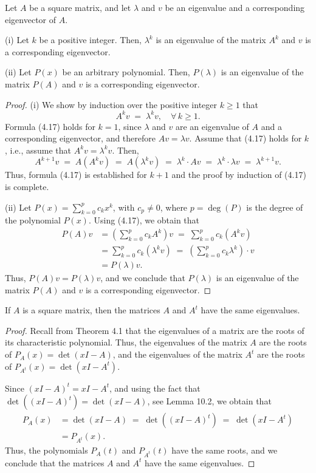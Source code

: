 \begin{lemma}
Let $A$ be a square matrix, and let $\lambda$ and $v$ be an eigenvalue and a
corresponding eigenvector of $A$.

(i) Let $k$ be a positive integer. Then, $\lambda^k$ is an eigenvalue of the matrix
$A^k$ and $v$ is a corresponding eigenvector.

(ii) Let $P(x)$ be an arbitrary polynomial. Then, $P(\lambda)$ is an eigenvalue of the
matrix $P(A)$ and $v$ is a corresponding eigenvector.
\end{lemma}

\begin{proof}
(i) We show by induction over the positive integer $k \geq 1$ that
\begin{equation}
A^k v \;=\; \lambda^k v, \quad \forall\, k \geq 1.
\end{equation}
Formula (4.17) holds for $k=1$, since $\lambda$ and $v$ are an eigenvalue of $A$ and a
corresponding eigenvector, and therefore $Av = \lambda v$. Assume that (4.17) holds
for $k$, i.e., assume that $A^k v = \lambda^k v$. Then,
\[
A^{k+1}v \;=\; A(A^k v) \;=\; A(\lambda^k v) \;=\; \lambda^k \cdot Av \;=\;
\lambda^k \cdot \lambda v \;=\; \lambda^{k+1}v.
\]
Thus, formula (4.17) is established for $k+1$ and the proof by induction of (4.17) is
complete.

(ii) Let $P(x) = \sum_{k=0}^p c_k x^k$, with $c_p \neq 0$, where $p = \deg(P)$ is the
degree of the polynomial $P(x)$. Using (4.17), we obtain that
\begin{align*}
P(A)v &= \left( \sum_{k=0}^p c_k A^k \right) v \;=\; \sum_{k=0}^p c_k \left( A^k v
\right)\\
&= \sum_{k=0}^p c_k \left( \lambda^k v \right) \;=\; \left( \sum_{k=0}^p c_k
\lambda^k \right) \cdot v\\
&= P(\lambda) v.
\end{align*}
Thus, $P(A)v = P(\lambda)v$, and we conclude that $P(\lambda)$ is an eigenvalue of the
matrix $P(A)$ and $v$ is a corresponding eigenvector.
\end{proof}

\begin{lemma}
If $A$ is a square matrix, then the matrices $A$ and $A^t$ have the same eigenvalues.
\end{lemma}

\begin{proof}
Recall from Theorem 4.1 that the eigenvalues of a matrix are the roots of its
characteristic polynomial. Thus, the eigenvalues of the matrix $A$ are the roots of
$P_A(x) = \det(xI-A)$, and the eigenvalues of the matrix $A^t$ are the roots of
$P_{A^t}(x) = \det(xI-A^t)$.

Since $(xI-A)^t = xI-A^t$, and using the fact that $\det((xI-A)^t) = \det(xI-A)$, see
Lemma 10.2, we obtain that
\begin{align*}
P_A(x) &= \det(xI-A) \;=\; \det((xI-A)^t) \;=\; \det(xI-A^t)\\
&= P_{A^t}(x).
\end{align*}
Thus, the polynomials $P_A(t)$ and $P_{A^t}(t)$ have the same roots, and we conclude
that the matrices $A$ and $A^t$ have the same eigenvalues.
\end{proof}

